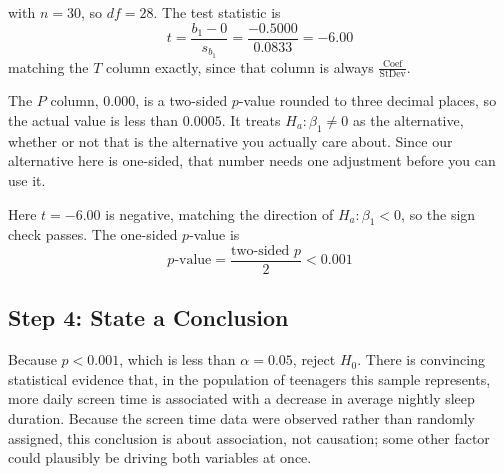 with $n = 30$, so $df = 28$. The test statistic is
\[
t = \frac{b_1 - 0}{s_{b_1}} = \frac{-0.5000}{0.0833} = -6.00
\]
matching the $T$ column exactly, since that column is always $\frac{\text{Coef}}{\text{StDev}}$.

The $P$ column, $0.000$, is a two-sided $p$-value rounded to three decimal places, so the actual value is less than $0.0005$. It treats $H_a: \beta_1 \ne 0$ as the alternative, whether or not that is the alternative you actually care about. Since our alternative here is one-sided, that number needs one adjustment before you can use it.

\begin{center}
\end{center}

Here $t = -6.00$ is negative, matching the direction of $H_a: \beta_1 < 0$, so the sign check passes. The one-sided $p$-value is
\[
p\text{-value} = \frac{\text{two-sided } p}{2} < 0.001
\]

\subsection*{Step 4: State a Conclusion}

Because $p < 0.001$, which is less than $\alpha = 0.05$, reject $H_0$. There is convincing statistical evidence that, in the population of teenagers this sample represents, more daily screen time is associated with a decrease in average nightly sleep duration. Because the screen time data were observed rather than randomly assigned, this conclusion is about association, not causation; some other factor could plausibly be driving both variables at once.

